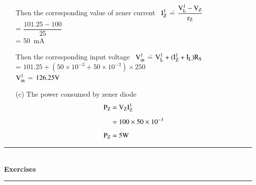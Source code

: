 \begin{solution}
\begin{itemize}
\begin{tabbing}
Then the corresponding value of zener current \ $\textrm{I}^{1}_{\textrm{Z}}$ \== $\dfrac{\textrm{V}^{1}_{\textrm{L}}-\textrm{V}_{\textrm{Z}}}{\textrm{r}_{\textrm{Z}}}$\\[5pt]
\>= $\dfrac{101.25-100}{25}$\\[4pt]
\>= 50~mA
\end{tabbing}

\begin{tabbing}
Then the corresponding input voltage \ $\textrm{V}_{\text{in}}^{1}$ \== $\textrm{V}^{1}_{\textrm{L}}+(\textrm{I}^{1}_{\textrm{Z}}+\textrm{I}_{\textrm{L}})\textrm{R}_{\textrm{S}}$\\[5pt]
\>= $101.25+(50\times 10^{-3}+50\times 10^{-3})\times 250$\\[5pt]
$\textrm{V}^{1}_{\text{in}}$ \>= $126.25\textrm{V}$
\end{tabbing}

\item[(c)] The power consumed by zener diode
\begin{align*}
\textrm{P}_{\textrm{Z}} &= \textrm{V}_{\textrm{Z}}\textrm{I}^{1}_{\textrm{Z}}\\[5pt]
&= 100\times 50\times 10^{-3}\\[5pt]
\textrm{P}_{\textrm{Z}} &= 5\textrm{W}
\end{align*}
\end{itemize}
\end{solution}

\eject

\begin{center}
\rule{4cm}{1pt}\\
{\bf\Large Exercises}\\[-3pt]
\rule{4cm}{1pt}
\end{center}

